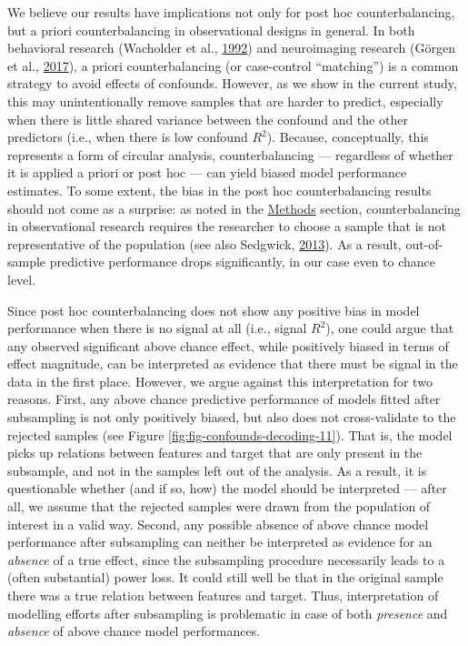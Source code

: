 \documentclass[12pt,american,a4paper,oneside,]{memoir} %
\begin{document}
We believe our results have implications not only for post hoc counterbalancing, but a priori counterbalancing in observational designs in general. In both behavioral research (Wacholder et al., \protect\hyperlink{ref-Wacholder1992-wb}{1992}) and neuroimaging research (Görgen et al., \protect\hyperlink{ref-Gorgen2017-sy}{2017}), a priori counterbalancing (or case-control ``matching'') is a common strategy to avoid effects of confounds. However, as we show in the current study, this may unintentionally remove samples that are harder to predict, especially when there is little shared variance between the confound and the other predictors (i.e., when there is low confound \(R^2\)). Because, conceptually, this represents a form of circular analysis, counterbalancing --- regardless of whether it is applied a priori or post hoc --- can yield biased model performance estimates. To some extent, the bias in the post hoc counterbalancing results should not come as a surprise: as noted in the \protect\hyperlink{confounds-decoding-methods}{Methods} section, counterbalancing in observational research requires the researcher to choose a sample that is not representative of the population (see also Sedgwick, \protect\hyperlink{ref-Sedgwick2013-op}{2013}). As a result, out-of-sample predictive performance drops significantly, in our case even to chance level.

Since post hoc counterbalancing does not show any positive bias in model performance when there is no signal at all (i.e., signal \(R^2\)), one could argue that any observed significant above chance effect, while positively biased in terms of effect magnitude, can be interpreted as evidence that there must be signal in the data in the first place. However, we argue against this interpretation for two reasons. First, any above chance predictive performance of models fitted after subsampling is not only positively biased, but also does not cross-validate to the rejected samples (see Figure \ref{fig:fig-confounds-decoding-11}). That is, the model picks up relations between features and target that are only present in the subsample, and not in the samples left out of the analysis. As a result, it is questionable whether (and if so, how) the model should be interpreted --- after all, we assume that the rejected samples were drawn from the population of interest in a valid way. Second, any possible absence of above chance model performance after subsampling can neither be interpreted as evidence for an \emph{absence} of a true effect, since the subsampling procedure necessarily leads to a (often substantial) power loss. It could still well be that in the original sample there was a true relation between features and target. Thus, interpretation of modelling efforts after subsampling is problematic in case of both \emph{presence} and \emph{absence} of above chance model performances.
\end{document}
